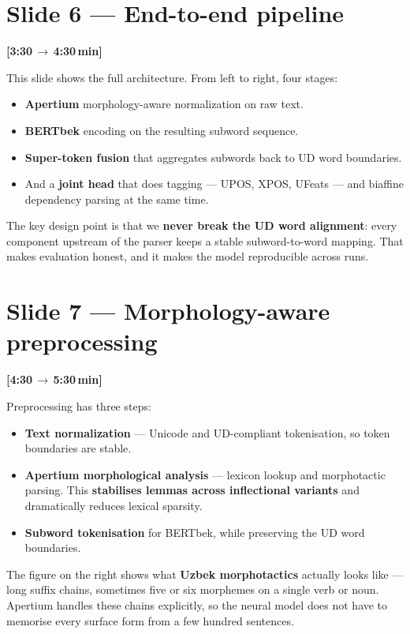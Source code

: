 \documentclass[12pt,a4paper]{article}
\newcommand{\timing}[2]{%
   \par\noindent\textbf{\small [#1\,$\to$\,#2\,min]}\par\vspace{0.2em}}
\newcommand{\say}[1]{\textbf{#1}}
\begin{document}
\section*{Slide 6 --- End-to-end pipeline}
\timing{3:30}{4:30}

This slide shows the full architecture. From left to right, four stages:

\begin{itemize}
   \item \textbf{Apertium} morphology-aware normalization on raw text.
   \item \textbf{BERTbek} encoding on the resulting subword sequence.
   \item \textbf{Super-token fusion} that aggregates subwords back to UD word boundaries.
   \item And a \textbf{joint head} that does tagging --- UPOS, XPOS, UFeats --- and biaffine dependency parsing at the same time.
\end{itemize}

\noindent
The key design point is that we \say{never break the UD word
alignment}: every component upstream of the parser keeps a stable
subword-to-word mapping. That makes evaluation honest, and it makes the
model reproducible across runs.


\section*{Slide 7 --- Morphology-aware preprocessing}
\timing{4:30}{5:30}

Preprocessing has three steps:

\begin{itemize}
   \item \textbf{Text normalization} --- Unicode and UD-compliant tokenisation, so token boundaries are stable.
   \item \textbf{Apertium morphological analysis} --- lexicon lookup and morphotactic parsing. This \say{stabilises lemmas across inflectional variants} and dramatically reduces lexical sparsity.
   \item \textbf{Subword tokenisation} for BERTbek, while preserving the UD word boundaries.
\end{itemize}

\noindent
The figure on the right shows what \say{Uzbek morphotactics} actually
looks like --- long suffix chains, sometimes five or six morphemes on a
single verb or noun. Apertium handles these chains explicitly, so the
neural model does not have to memorise every surface form from a few
hundred sentences.
\end{document}
